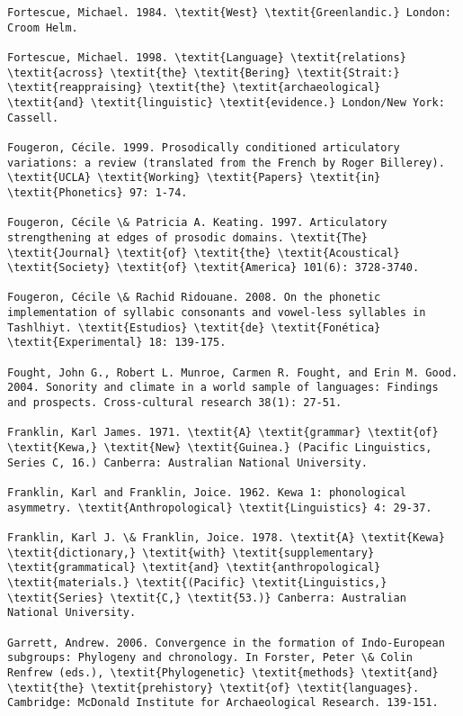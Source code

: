 \begin{verbatim}
Fortescue, Michael. 1984. \textit{West} \textit{Greenlandic.} London: Croom Helm.

Fortescue, Michael. 1998. \textit{Language} \textit{relations} \textit{across} \textit{the} \textit{Bering} \textit{Strait:} \textit{reappraising} \textit{the} \textit{archaeological} \textit{and} \textit{linguistic} \textit{evidence.} London/New York: Cassell.

Fougeron, Cécile. 1999. Prosodically conditioned articulatory variations: a review (translated from the French by Roger Billerey). \textit{UCLA} \textit{Working} \textit{Papers} \textit{in} \textit{Phonetics} 97: 1-74.

Fougeron, Cécile \& Patricia A. Keating. 1997. Articulatory strengthening at edges of prosodic domains. \textit{The} \textit{Journal} \textit{of} \textit{the} \textit{Acoustical} \textit{Society} \textit{of} \textit{America} 101(6): 3728-3740.

Fougeron, Cécile \& Rachid Ridouane. 2008. On the phonetic implementation of syllabic consonants and vowel-less syllables in Tashlhiyt. \textit{Estudios} \textit{de} \textit{Fonética} \textit{Experimental} 18: 139-175.

Fought, John G., Robert L. Munroe, Carmen R. Fought, and Erin M. Good. 2004. Sonority and climate in a world sample of languages: Findings and prospects. Cross-cultural research 38(1): 27-51.

Franklin, Karl James. 1971. \textit{A} \textit{grammar} \textit{of} \textit{Kewa,} \textit{New} \textit{Guinea.} (Pacific Linguistics, Series C, 16.) Canberra: Australian National University.

Franklin, Karl and Franklin, Joice. 1962. Kewa 1: phonological asymmetry. \textit{Anthropological} \textit{Linguistics} 4: 29-37.

Franklin, Karl J. \& Franklin, Joice. 1978. \textit{A} \textit{Kewa} \textit{dictionary,} \textit{with} \textit{supplementary} \textit{grammatical} \textit{and} \textit{anthropological} \textit{materials.} \textit{(Pacific} \textit{Linguistics,} \textit{Series} \textit{C,} \textit{53.)} Canberra: Australian National University.

Garrett, Andrew. 2006. Convergence in the formation of Indo-European subgroups: Phylogeny and chronology. In Forster, Peter \& Colin Renfrew (eds.), \textit{Phylogenetic} \textit{methods} \textit{and} \textit{the} \textit{prehistory} \textit{of} \textit{languages}. Cambridge: McDonald Institute for Archaeological Research. 139-151.


\end{verbatim}
